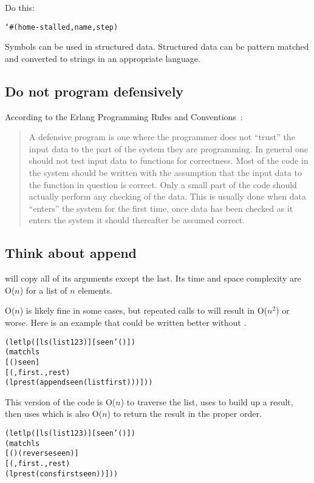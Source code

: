 \documentclass[letterpaper,11pt,twoside,final]{article}
\begin{document}
Do this:
\antipar
\begin{alltt}
`\#(home-stalled ,name ,step)
\end{alltt}

Symbols can be used in structured data. Structured data can be pattern
matched and converted to strings in an appropriate language.

\subsection* {Do not program defensively}

According to the Erlang Programming Rules and Conventions~\cite{erlang-programming-rules}:

\begin{quotation}
\noindent
A defensive program is one where the programmer does not ``trust'' the input
data to the part of the system they are programming. In general one should not
test input data to functions for correctness. Most of the code in the system
should be written with the assumption that the input data to the function in
question is correct. Only a small part of the code should actually perform any
checking of the data. This is usually done when data ``enters'' the system for
the first time, once data has been checked as it enters the system it should
thereafter be assumed correct.
\end{quotation}

\subsection* {Think about append}

 will copy all of its arguments except the last. Its
time and space complexity are O($n$) for a list of $n$ elements.

O($n$) is likely fine in some cases, but repeated calls to
 will result in O($n^2$) or worse. Here is an example
that could be written better without .
\antipar
\begin{alltt}
(let lp ([ls (list 1 2 3)] [seen '()])
  (match ls
    [() seen]
    [(,first . ,rest)
     (lp rest (append seen (list first)))]))
\end{alltt}

This version of the code is O($n$) to traverse the list, uses
 to build up a result, then uses  which
is also O($n$) to return the result in the proper order.
\antipar
\begin{alltt}
(let lp ([ls (list 1 2 3)] [seen '()])
  (match ls
    [() (reverse seen)]
    [(,first . ,rest)
     (lp rest (cons first seen))]))
\end{alltt}
\end{document}
